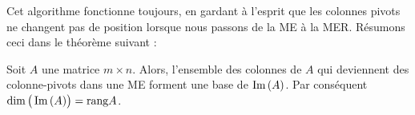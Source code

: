 Cet algorithme fonctionne toujours, en gardant à l'esprit que les colonnes pivots ne changent pas de position lorsque nous passons de la ME à la MER. Résumons ceci dans le théorème suivant :


\begin{theorem}\label{basisColA}
Soit $A$ une matrice $m\times n$.  Alors, l'ensemble des colonnes de $A$ qui deviennent des colonne-pivots dans une ME forment une base de $\operatorname{Im}\,(A)$. Par conséquent $\dim \big(\operatorname{Im}\,(A)\big)=\textrm{rang} A$.
\end{theorem}


